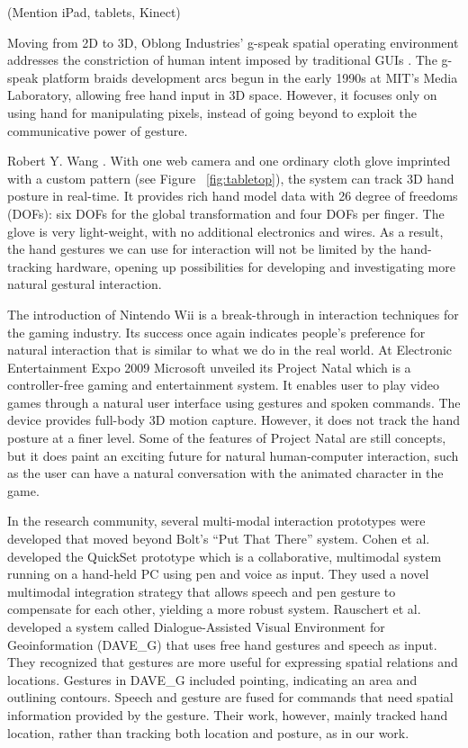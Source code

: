 (Mention iPad, tablets, Kinect)

Moving from 2D to 3D, Oblong Industries' g-speak spatial operating environment addresses the constriction of human intent imposed by traditional GUIs \cite{Oblong09}. The g-speak platform braids development arcs begun in the early 1990s at MIT's Media Laboratory, allowing free hand input in 3D space. However, it focuses only on using hand for manipulating pixels, instead of going beyond to exploit the communicative power of gesture. 

Robert Y. Wang \cite{Wang09}. With one web camera and one ordinary cloth glove imprinted with a custom pattern (see Figure ~\ref{fig:tabletop}), the system can track 3D hand posture in real-time. It provides rich hand model data with 26 degree of freedoms (DOFs): six DOFs for the global transformation and four DOFs per finger. The glove is very light-weight, with no additional electronics and wires. As a result, the hand gestures we can use for interaction will not be limited by the hand-tracking hardware, opening up possibilities for developing and investigating more natural gestural interaction.

The introduction of Nintendo Wii is a break-through in interaction techniques for the gaming industry. Its success once again indicates people's preference for natural interaction that is similar to what we do in the real world. At Electronic Entertainment Expo 2009 Microsoft unveiled its Project Natal which is a controller-free gaming and entertainment system. It enables user to play video games through a natural user interface using gestures and spoken commands. The device provides full-body 3D motion capture. However, it does not track the hand posture at a finer level. Some of the features of Project Natal are still concepts, but it does paint an exciting future for natural human-computer interaction, such as the user can have a natural conversation with the animated character in the game.

In the research community, several multi-modal interaction prototypes were developed that moved beyond Bolt's ``Put That There'' system. Cohen et al. \cite{Cohen97} developed the QuickSet prototype which is a collaborative, multimodal system running on a hand-held PC using pen and voice as input. They used a novel multimodal integration strategy that allows speech and pen gesture to compensate for each other, yielding a more robust system. Rauschert et al. \cite{Rauschert02} developed a system called Dialogue-Assisted Visual Environment for Geoinformation (DAVE\_G) that uses free hand gestures and speech as input. They recognized that gestures are more useful for expressing spatial relations and locations. Gestures in DAVE\_G included pointing, indicating an area and outlining contours. Speech and gesture are fused for commands that need spatial information provided by the gesture. Their work, however, mainly tracked hand location, rather than tracking both location and posture, as in our work.

